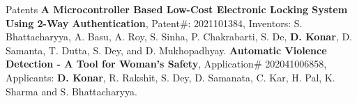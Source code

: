 \begin{rubric}{Patents}
\entry*[March 2021] \textbf{A Microcontroller Based Low-Cost Electronic Locking System Using 2-Way Authentication}, Patent\#: 2021101384,
Inventors: S. Bhattacharyya, A. Basu, A. Roy, S. Sinha, P. Chakrabarti, S. De, \textbf{D. Konar}, D. Samanta, T. Dutta, S. Dey, and D. Mukhopadhyay.
\entry*[February 2020] \textbf{Automatic Violence Detection - A Tool for Woman’s Safety}, Application\# 202041006858, 
Applicants: \textbf{D. Konar}, R. Rakshit, S. Dey, D. Samanata, C. Kar, H. Pal, K. Sharma and S. Bhattacharyya.
\end{rubric}